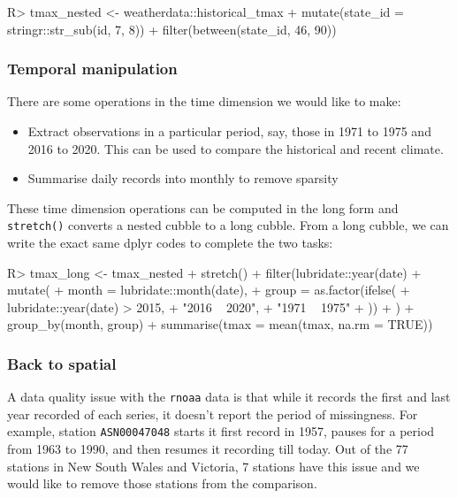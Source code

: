 \documentclass[
]{jss}
\providecommand{\tightlist}{%
  \setlength{\itemsep}{0pt}\setlength{\parskip}{0pt}}
\begin{document}
\begin{CodeChunk}
\begin{CodeInput}
R> tmax_nested <- weatherdata::historical_tmax %
+   mutate(state_id = stringr::str_sub(id, 7, 8)) %
+   filter(between(state_id, 46, 90))
\end{CodeInput}
\end{CodeChunk}

\hypertarget{temporal-manipulation}{%
\subsubsection{Temporal manipulation}\label{temporal-manipulation}}

There are some operations in the time dimension we would like to make:

\begin{itemize}
\tightlist
\item
  Extract observations in a particular period, say, those in 1971 to
  1975 and 2016 to 2020. This can be used to compare the historical and
  recent climate.
\item
  Summarise daily records into monthly to remove sparsity
\end{itemize}

These time dimension operations can be computed in the long form and
\texttt{stretch()} converts a nested cubble to a long cubble. From a
long cubble, we can write the exact same dplyr codes to complete the two
tasks:

\begin{CodeChunk}
\begin{CodeInput}
R> tmax_long <- tmax_nested %
+   stretch() %
+   filter(lubridate::year(date) %
+   mutate(
+     month = lubridate::month(date),
+     group = as.factor(ifelse(
+       lubridate::year(date) > 2015,
+       "2016 ~ 2020",
+       "1971 ~ 1975"
+     ))
+   ) %
+   group_by(month, group) %
+   summarise(tmax = mean(tmax, na.rm = TRUE))
\end{CodeInput}
\end{CodeChunk}

\hypertarget{back-to-spatial}{%
\subsubsection{Back to spatial}\label{back-to-spatial}}

A data quality issue with the \texttt{rnoaa} data is that while it
records the first and last year recorded of each series, it doesn't
report the period of missingness. For example, station
\texttt{ASN00047048} starts it first record in 1957, pauses for a period
from 1963 to 1990, and then resumes it recording till today. Out of the
77 stations in New South Wales and Victoria, 7 stations have this issue
and we would like to remove those stations from the comparison.
\end{document}
